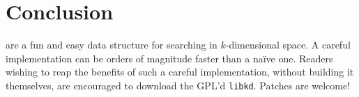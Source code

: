 


%
%
%





\section{Conclusion}

\Kdtrees are a fun and easy data structure for searching in $k$-dimensional
space. A careful implementation can be orders of magnitude faster than
a na\"ive one. Readers wishing to reap the benefits of such a careful
implementation, without building it themselves, are encouraged to
download the GPL'd {\tt libkd}. Patches are welcome!

